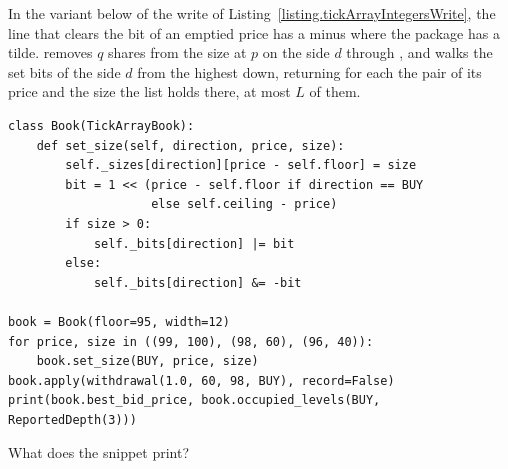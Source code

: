 \begin{question}
\label{question.occupancyClearedWithMinusForTilde}
In the variant below of the write of Listing~\ref{listing.tickArrayIntegersWrite},
the line that clears the bit of an emptied price has a minus where the package has a tilde.
 removes $q$ shares from the size at $p$ on the side $d$
through ,
and  walks the set bits of the side $d$ from the highest down,
returning for each the pair of its price and the size the list holds there,
at most $L$ of them.
\begin{lstlisting}[caption={A minus for a tilde}, label=listing.occupancyClearedWithMinus]
class Book(TickArrayBook):
    def set_size(self, direction, price, size):
        self._sizes[direction][price - self.floor] = size
        bit = 1 << (price - self.floor if direction == BUY
                    else self.ceiling - price)
        if size > 0:
            self._bits[direction] |= bit
        else:
            self._bits[direction] &= -bit

book = Book(floor=95, width=12)
for price, size in ((99, 100), (98, 60), (96, 40)):
    book.set_size(BUY, price, size)
book.apply(withdrawal(1.0, 60, 98, BUY), record=False)
print(book.best_bid_price, book.occupied_levels(BUY, ReportedDepth(3)))
\end{lstlisting}
What does the snippet print?
\begin{choices}
 \choice {}
 \choice {}
 \choice {}
 \choice {}
 \correctchoice {}
\end{choices}
\end{question}


